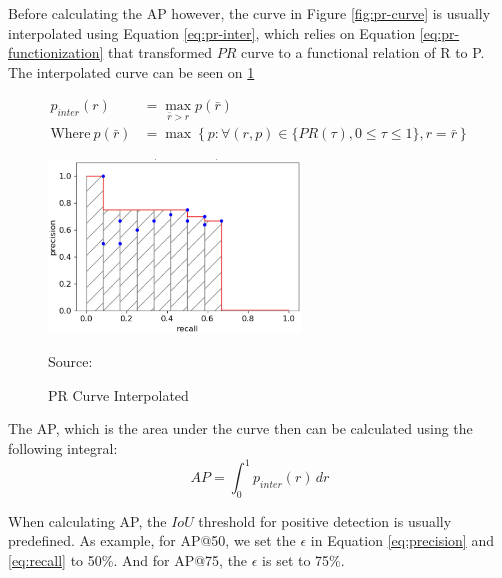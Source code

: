   Before calculating the AP however, the curve in Figure \ref{fig:pr-curve} is usually interpolated using Equation \ref{eq:pr-inter},
  which relies on Equation \ref{eq:pr-functionization} that transformed $PR$ curve to a functional relation of R to P.
  The interpolated curve can be seen on \ref{fig:pr-interp}

  \begin{align}
    \label{eq:pr-inter}
    p_{inter}(r) &= \max_{\bar{r}>r} p(\bar{r})\\
    \label{eq:pr-functionization}
    \text{Where}~p(\bar{r}) &= \max \left\{p : \forall (r,p) \in \{PR(\tau) , 0\leq\tau\leq 1\}, r=\bar{r}\right\}%
  \end{align}

  \begin{figure}[H]
        \centering
        \includegraphics[width=0.6\textwidth]{figures/pr-interp.png}
        \vspace{-1ex}
        \caption*{Source: \textcite{map-hui}}
        \vspace{-1ex}
        \caption{PR Curve Interpolated}
        \label{fig:pr-interp}
  \end{figure}
  The AP, which is the area under the curve then can be calculated using the following integral:
  \begin{equation}
    AP = \int_{0}^{1} p_{inter}(r) \, dr
  \end{equation}

  When calculating AP, the $IoU$ threshold for positive detection is usually predefined. As example,
  for AP@50, we set the $\epsilon$ in Equation \ref{eq:precision} and \ref{eq:recall} to 50\%. And for 
  AP@75, the $\epsilon$ is set to 75\%.

